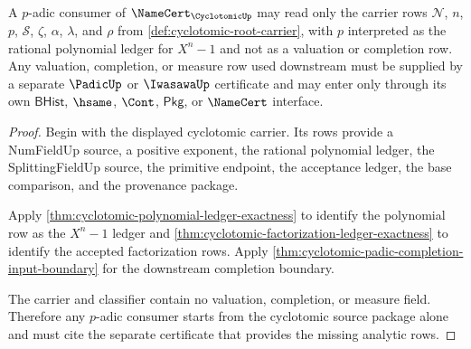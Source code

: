 \begin{theorem}
\label{thm:cyclotomic-padic-consumer-obligation}
A $p$-adic consumer of $\NameCert_{\CyclotomicUp}$ may read only the carrier rows $\mathcal{N}$, $n$, $p$, $\mathcal{S}$, $\zeta$, $\alpha$, $\lambda$, and $\rho$ from \autoref{def:cyclotomic-root-carrier}, with $p$ interpreted as the rational polynomial ledger for $X^n-1$ and not as a valuation or completion row. Any valuation, completion, or measure row used downstream must be supplied by a separate $\PadicUp$ or $\IwasawaUp$ certificate and may enter only through its own $\mathsf{BHist}$, $\hsame$, $\Cont$, $\mathsf{Pkg}$, or $\NameCert$ interface.
\end{theorem}
\begin{proof}
Begin with the displayed cyclotomic carrier. Its rows provide a NumFieldUp source, a positive exponent, the rational polynomial ledger, the SplittingFieldUp source, the primitive endpoint, the acceptance ledger, the base comparison, and the provenance package.

Apply \autoref{thm:cyclotomic-polynomial-ledger-exactness} to identify the polynomial row as the $X^n-1$ ledger and \autoref{thm:cyclotomic-factorization-ledger-exactness} to identify the accepted factorization rows. Apply \autoref{thm:cyclotomic-padic-completion-input-boundary} for the downstream completion boundary.

The carrier and classifier contain no valuation, completion, or measure field. Therefore any $p$-adic consumer starts from the cyclotomic source package alone and must cite the separate certificate that provides the missing analytic rows.
\end{proof}

